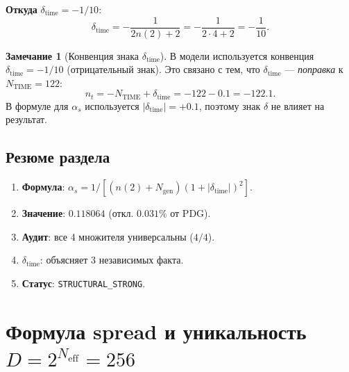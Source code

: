 \documentclass[11pt,a4paper]{article}
\theoremstyle{definition}
\newtheorem{remark}[theorem]{Замечание}
\begin{document}
\medskip\noindent
\textbf{Откуда} $\delta_{\text{time}} = -1/10$:
\begin{equation}
    \delta_{\text{time}} = -\frac{1}{2n(2) + 2} = -\frac{1}{2 \cdot 4 + 2} = -\frac{1}{10}.
    \label{eq:delta-time-origin}
\end{equation}

\begin{remark}[Конвенция знака $\delta_{\text{time}}$]
\label{rem:delta-time-convention}
В модели используется конвенция
$\delta_{\text{time}} = -1/10$ (отрицательный знак).
Это связано с тем, что $\delta_{\text{time}}$ ---
\emph{поправка} к $N_{\text{TIME}} = 122$:
\begin{equation}
    n_t = -N_{\text{TIME}} + \delta_{\text{time}}
    = -122 - 0.1 = -122.1.
\end{equation}
В формуле для $\alpha_s$ используется
$|\delta_{\text{time}}| = +0.1$, поэтому знак $\delta$
не влияет на результат.
\end{remark}

\subsection{Резюме раздела}
\label{subsec:alphas-summary}

\begin{enumerate}
    \item \textbf{Формула}: $\alpha_s = 1/[(n(2)+N_{\text{gen}})(1+|\delta_{\text{time}}|)^2]$.
    \item \textbf{Значение}: $0.118064$ (откл. $0.031\%$ от PDG).
    \item \textbf{Аудит}: все 4 множителя универсальны ($4/4$).
    \item \textbf{$\delta_{\text{time}}$}: объясняет 3 независимых факта.
    \item \textbf{Статус}: \texttt{STRUCTURAL\_STRONG}.
\end{enumerate}
\section{Формула spread и уникальность \texorpdfstring{$D = 2^{N_{\text{eff}}} = 256$}{D = 2\^{}N\_eff = 256}}
\label{sec:spread}
\end{document}
